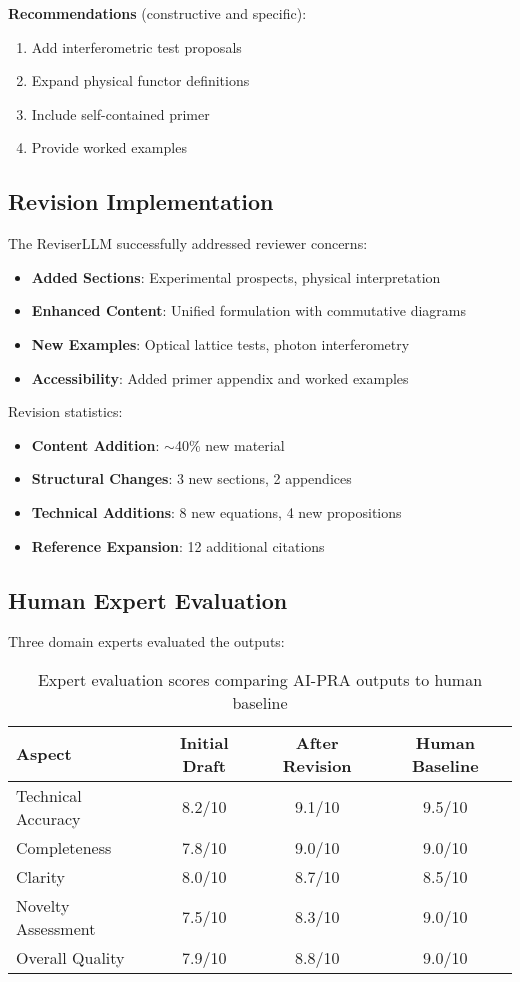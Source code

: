 \documentclass[11pt,a4paper]{article}
\begin{document}
\textbf{Recommendations} (constructive and specific):
\begin{enumerate}
    \item Add interferometric test proposals
    \item Expand physical functor definitions
    \item Include self-contained primer
    \item Provide worked examples
\end{enumerate}

\subsection{Revision Implementation}

The ReviserLLM successfully addressed reviewer concerns:

\begin{itemize}
    \item \textbf{Added Sections}: Experimental prospects, physical interpretation
    \item \textbf{Enhanced Content}: Unified formulation with commutative diagrams
    \item \textbf{New Examples}: Optical lattice tests, photon interferometry
    \item \textbf{Accessibility}: Added primer appendix and worked examples
\end{itemize}

Revision statistics:
\begin{itemize}
    \item \textbf{Content Addition}: $\sim$40\% new material
    \item \textbf{Structural Changes}: 3 new sections, 2 appendices
    \item \textbf{Technical Additions}: 8 new equations, 4 new propositions
    \item \textbf{Reference Expansion}: 12 additional citations
\end{itemize}

\subsection{Human Expert Evaluation}

Three domain experts evaluated the outputs:

\begin{table}[h]
\centering
\begin{tabular}{lccc}
\toprule
\textbf{Aspect} & \textbf{Initial Draft} & \textbf{After Revision} & \textbf{Human Baseline} \\
\midrule
Technical Accuracy & 8.2/10 & 9.1/10 & 9.5/10 \\
Completeness & 7.8/10 & 9.0/10 & 9.0/10 \\
Clarity & 8.0/10 & 8.7/10 & 8.5/10 \\
Novelty Assessment & 7.5/10 & 8.3/10 & 9.0/10 \\
Overall Quality & 7.9/10 & 8.8/10 & 9.0/10 \\
\bottomrule
\end{tabular}
\caption{Expert evaluation scores comparing AI-PRA outputs to human baseline}
\end{table}
\end{document}

